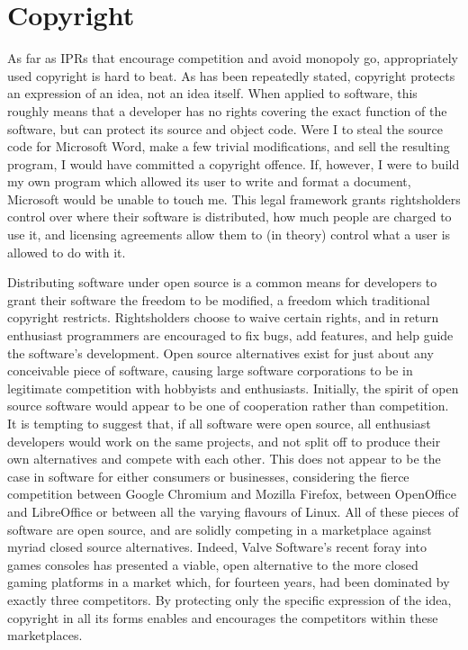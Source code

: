 \section{Copyright}

As far as IPRs that encourage competition and avoid monopoly go, appropriately used copyright is hard to beat. As has been repeatedly stated, copyright protects an expression of an idea, not an idea itself. When applied to software, this roughly means that a developer has no rights covering the exact function of the software, but can protect its source and object code. Were I to steal the source code for Microsoft Word, make a few trivial modifications, and sell the resulting program, I would have committed a copyright offence. If, however, I were to build my own program which allowed its user to write and format a document, Microsoft would be unable to touch me. This legal framework grants rightsholders control over where their software is distributed, how much people are charged to use it, and licensing agreements allow them to (in theory) control what a user is allowed to do with it.

Distributing software under open source is a common means for developers to grant their software the freedom to be modified, a freedom which traditional copyright restricts. Rightsholders choose to waive certain rights, and in return enthusiast programmers are encouraged to fix bugs, add features, and help guide the software's development. Open source alternatives exist for just about any conceivable piece of software, causing large software corporations to be in legitimate competition with hobbyists and enthusiasts. Initially, the spirit of open source software would appear to be one of cooperation rather than competition. It is tempting to suggest that, if all software were open source, all enthusiast developers would work on the same projects, and not split off to produce their own alternatives and compete with each other. This does not appear to be the case in software for either consumers or businesses, considering the fierce competition between Google Chromium and Mozilla Firefox, between OpenOffice and LibreOffice or between all the varying flavours of Linux. All of these pieces of software are open source, and are solidly competing %
in a marketplace against myriad closed source alternatives. Indeed, Valve Software's recent foray into games consoles has presented a viable, open alternative to the more closed gaming platforms in a market which, for fourteen years, had been dominated by exactly three competitors. By protecting only the specific expression of the idea, copyright in all its forms enables and encourages the competitors within these marketplaces.

